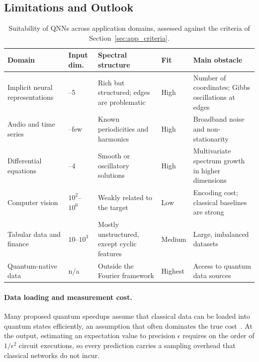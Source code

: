 \documentclass[12pt]{article}
\numberwithin{equation}{section}  %
\begin{document}
\subsection{Limitations and Outlook}
\label{sec:app_limitations}

\begin{table}[t]
\centering
\caption{Suitability of QNNs across application domains, assessed against the criteria of Section~\ref{sec:app_criteria}.}
\label{tab:applications}
\small
\begin{tabular}{>{\raggedright\arraybackslash}p{2.8cm}>{\raggedright\arraybackslash}p{1.8cm}>{\raggedright\arraybackslash}p{3.5cm}>{\raggedright\arraybackslash}p{1.4cm}>{\raggedright\arraybackslash}p{3.9cm}}
\toprule
Domain & Input dim. & Spectral structure & Fit & Main obstacle \\
\midrule
Implicit neural representations & 1--5 & Rich but structured; edges are problematic & High & Number of coordinates; Gibbs oscillations at edges \\
Audio and time series & 1--few & Known periodicities and harmonics & High & Broadband noise and non-stationarity \\
Differential equations & 1--4 & Smooth or oscillatory solutions & High & Multivariate spectrum growth in higher dimensions \\
Computer vision & $10^2$--$10^6$ & Weakly related to the target & Low & Encoding cost; classical baselines are strong \\
Tabular data and finance & $10$--$10^3$ & Mostly unstructured, except cyclic features & Medium & Large, imbalanced datasets \\
Quantum-native data & n/a & Outside the Fourier framework & Highest & Access to quantum data sources \\
\bottomrule
\end{tabular}
\end{table}

\paragraph{Data loading and measurement cost.} Many proposed quantum speedups assume that classical data can be loaded into quantum states efficiently, an assumption that often dominates the true cost~\cite{aaronson2015read}. At the output, estimating an expectation value to precision $\epsilon$ requires on the order of $1/\epsilon^2$ circuit executions, so every prediction carries a sampling overhead that classical networks do not incur.
\end{document}
